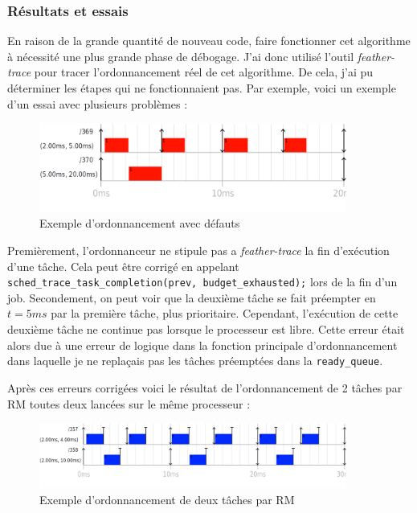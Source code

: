 \subsubsection{Résultats et essais}

En raison de la grande quantité de nouveau code, faire fonctionner cet algorithme à nécessité une plus grande phase de débogage. J'ai donc utilisé l'outil \textit{feather-trace} pour tracer l'ordonnancement réel de cet algorithme. De cela, j'ai pu déterminer les étapes qui ne fonctionnaient pas. Par exemple, voici un exemple d'un essai avec plusieurs problèmes : 
\begin{figure}[H]
    \centering
    \includegraphics[width=0.9\textwidth]{Images/schedule_host=rock960_scheduler=DEMO_trace=notstoped.png}
    \caption{Exemple d'ordonnancement avec défauts}
\end{figure}

Premièrement, l'ordonnanceur ne stipule pas a \textit{feather-trace} la fin d'exécution d'une tâche. Cela peut être corrigé en  appelant \texttt{sched\_trace\_task\_completion(prev, budget\_exhausted);} lors de la fin d'un job.
Secondement, on peut voir que la deuxième tâche se fait préempter en $t=5ms$ par la première tâche, plus prioritaire. Cependant, l'exécution de cette deuxième tâche ne continue pas lorsque le processeur est libre. Cette erreur était alors due à une erreur de logique dans la fonction principale d'ordonnancement dans laquelle je ne replaçais pas les tâches préemptées dans la \texttt{ready\_queue}.

Après ces erreurs corrigées voici le résultat de l'ordonnancement de 2 tâches par RM toutes deux lancées sur le même processeur :

\begin{figure}[H]
    \centering
    \includegraphics[width=0.9\textwidth]{Images/RM-No-Offset.png}
    \caption{Exemple d'ordonnancement de deux tâches par RM}
    \label{fig:rm-schedualibility-demo}
\end{figure}


